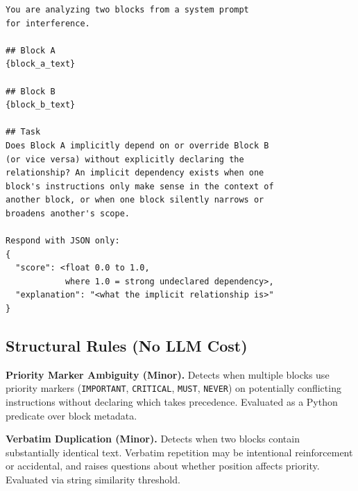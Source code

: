 \begin{Verbatim}
You are analyzing two blocks from a system prompt
for interference.

## Block A
{block_a_text}

## Block B
{block_b_text}

## Task
Does Block A implicitly depend on or override Block B
(or vice versa) without explicitly declaring the
relationship? An implicit dependency exists when one
block's instructions only make sense in the context of
another block, or when one block silently narrows or
broadens another's scope.

Respond with JSON only:
{
  "score": <float 0.0 to 1.0,
            where 1.0 = strong undeclared dependency>,
  "explanation": "<what the implicit relationship is>"
}
\end{Verbatim}

\subsection{Structural Rules (No LLM Cost)}

\textbf{Priority Marker Ambiguity (Minor).} Detects when multiple blocks
use priority markers (\texttt{IMPORTANT}, \texttt{CRITICAL},
\texttt{MUST}, \texttt{NEVER}) on potentially conflicting instructions
without declaring which takes precedence. Evaluated as a Python
predicate over block metadata.

\textbf{Verbatim Duplication (Minor).} Detects when two blocks contain
substantially identical text. Verbatim repetition may be intentional
reinforcement or accidental, and raises questions about whether position
affects priority. Evaluated via string similarity threshold.
